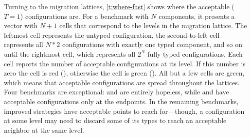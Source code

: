 Turning to the migration lattices, \cref{t:where-fast} shows where the
acceptable ($T  = 1$)
configurations are.
For a benchmark with $N$ components, it presents a vector with $N+1$ cells
that correspond to the levels in the migration lattice.
The leftmost cell represents the untyped configuration,
the second-to-left cell represents all $N * 2$ configurations with exactly one
typed component, and so on until the rightmost cell, which
represents all $2^N$ fully-typed configurations,
Each cell reports the number of acceptable configurations at its level.
If this number is zero the cell is red (\rboxtiny{}), otherwise
the cell is green (\gboxtiny{}).
All but a few cells are green, which means that acceptable configurations
are spread throughout the lattices.
Four benchmarks are exceptional:
 and  are entirely hopeless, while
 and  have acceptable configurations only
at the endpoints.
In the remaining benchmarks, improved strategies have acceptable points to
reach for---though, a configuration at some level may need to discard 
some of its types to reach an acceptable neighbor at the same level.

